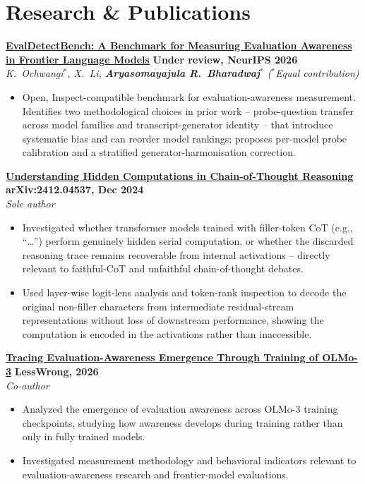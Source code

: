 \documentclass[11pt,a4paper]{article}
\newcommand{\entrygap}{\vspace{8pt}}
\begin{document}
\section{Research \& Publications}

\textbf{\href{https://arxiv.org/abs/2609.01611}{EvalDetectBench: A Benchmark for Measuring Evaluation Awareness in Frontier Language Models}} \hfill \textbf{Under review, NeurIPS 2026} \\
\textit{K.~Ochwangi$^*$, X.~Li, \textbf{Aryasomayajula R.~Bharadwaj}$^*$ \textmd{($^*$Equal contribution)}}
\begin{itemize}[leftmargin=*, nosep]
\item Open, Inspect-compatible benchmark for evaluation-awareness measurement. Identifies two methodological choices in prior work -- probe-question transfer across model families and transcript-generator identity -- that introduce systematic bias and can reorder model rankings; proposes per-model probe calibration and a stratified generator-harmonisation correction.
\end{itemize}

\entrygap
\textbf{\href{https://arxiv.org/abs/2412.04537}{Understanding Hidden Computations in Chain-of-Thought Reasoning}} \hfill \textbf{arXiv:2412.04537, Dec 2024} \\
\textit{Sole author}
\begin{itemize}[leftmargin=*, nosep]
\item Investigated whether transformer models trained with filler-token CoT (e.g., ``\dots'') perform genuinely hidden serial computation, or whether the discarded reasoning trace remains recoverable from internal activations -- directly relevant to faithful-CoT and unfaithful chain-of-thought debates.
\item Used layer-wise logit-lens analysis and token-rank inspection to decode the original non-filler characters from intermediate residual-stream representations without loss of downstream performance, showing the computation is encoded in the activations rather than inaccessible.
\end{itemize}


\entrygap
\textbf{\href{https://www.lesswrong.com/posts/c2tqL9xPbttisAHtt/tracing-eval-awareness-emergence-through-training-of-olmo-3}{Tracing Evaluation-Awareness Emergence Through Training of OLMo-3}} \hfill \textbf{LessWrong, 2026} \\
\textit{Co-author}
\begin{itemize}[leftmargin=*, nosep]
\item Analyzed the emergence of evaluation awareness across OLMo-3 training checkpoints, studying how awareness develops during training rather than only in fully trained models.
\item Investigated measurement methodology and behavioral indicators relevant to evaluation-awareness research and frontier-model evaluations.
\end{itemize}
\end{document}
